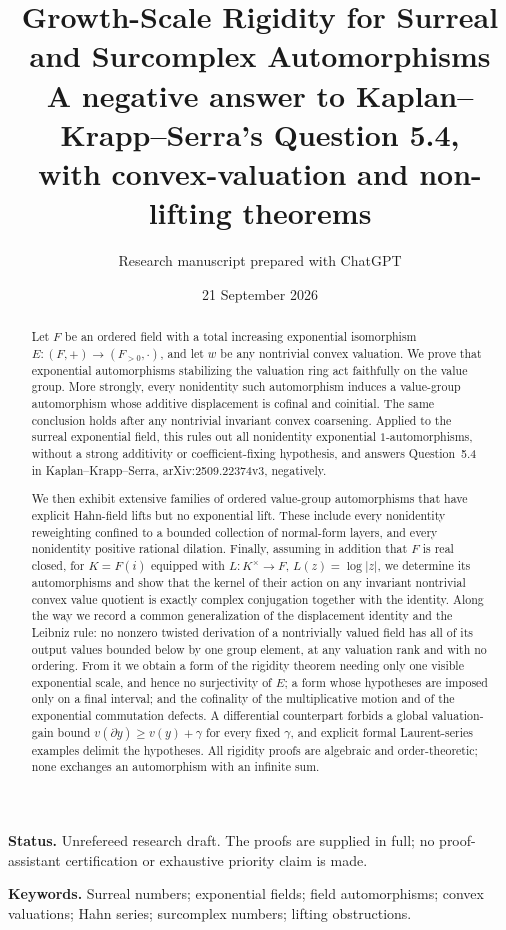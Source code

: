 \documentclass[11pt]{article}
\title{\color{inkblue}\bfseries Growth-Scale Rigidity for Surreal\texorpdfstring{\\}{ }and Surcomplex Automorphisms\\[0.5em]
\large A negative answer to Kaplan--Krapp--Serra's Question 5.4,\\
with convex-valuation and non-lifting theorems}
\author{Research manuscript prepared with ChatGPT}
\date{21 September 2026}
\theoremstyle{definition}
\theoremstyle{remark}
\newcommand{\abs}[1]{\lvert #1\rvert}
\numberwithin{equation}{section}
\begin{document}
\maketitle
\thispagestyle{empty}
\begin{abstract}
Let $F$ be an ordered field with a total increasing exponential isomorphism
$E:(F,+)\to(F_{>0},\cdot)$, and let $w$ be any nontrivial convex valuation.
We prove that exponential automorphisms stabilizing the valuation ring act
faithfully on the value group. More strongly, every nonidentity such
automorphism induces a value-group automorphism whose additive displacement
is cofinal and coinitial. The same conclusion holds after any nontrivial
invariant convex coarsening. Applied to the surreal exponential field, this
rules out all nonidentity exponential $1$-automorphisms, without a strong
additivity or coefficient-fixing hypothesis, and answers Question~5.4 in
Kaplan--Krapp--Serra, arXiv:2509.22374v3, negatively.

We then exhibit extensive families of ordered value-group automorphisms that
have explicit Hahn-field lifts but no exponential lift. These include every
nonidentity reweighting confined to a bounded collection of normal-form layers,
and every nonidentity positive rational dilation. Finally, assuming in addition
that $F$ is real closed, for $K=F(i)$ equipped with
$L:K^\times\to F$, $L(z)=\log\abs z$, we determine its automorphisms and show
that the kernel of their action on any invariant nontrivial convex value
quotient is exactly complex conjugation together with the identity.
Along the way we record a common generalization of the displacement identity
and the Leibniz rule: no nonzero twisted derivation of a nontrivially valued
field has all of its output values bounded below by one group element, at any
valuation rank and with no ordering. From it we obtain a form of the rigidity
theorem needing only one visible exponential scale, and hence no surjectivity
of $E$; a form whose hypotheses are imposed only on a final interval; and the
cofinality of the multiplicative motion and of the exponential commutation
defects. A differential counterpart forbids a global valuation-gain bound
$v(\partial y)\ge v(y)+\gamma$ for every fixed $\gamma$, and explicit formal
Laurent-series examples delimit the hypotheses.
All rigidity proofs are algebraic and order-theoretic; none exchanges an
automorphism with an infinite sum.
\end{abstract}
\begin{center}
\small\textbf{Status.} Unrefereed research draft. The proofs are supplied in full;
no proof-assistant certification or exhaustive priority claim is made.
\end{center}
\vspace{0.3em}
\noindent\textbf{Keywords.} Surreal numbers; exponential fields; field automorphisms;
convex valuations; Hahn series; surcomplex numbers; lifting obstructions.
\clearpage
\begingroup
\small
\setlength{\parskip}{0pt}
\tableofcontents
\endgroup
\clearpage
\end{document}
